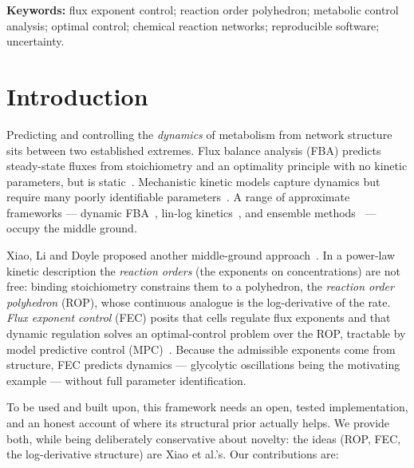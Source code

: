 \documentclass[11pt]{article}
\begin{document}
\noindent\textbf{Keywords:} flux exponent control; reaction order polyhedron;
metabolic control analysis; optimal control; chemical reaction networks;
reproducible software; uncertainty.

\tableofcontents

\section{Introduction}

Predicting and controlling the \emph{dynamics} of metabolism from network
structure sits between two established extremes. Flux balance analysis (FBA)
predicts steady-state fluxes from stoichiometry and an optimality principle with
no kinetic parameters, but is static~\citep{orth2010fba,varma1994stoichiometric}.
Mechanistic kinetic models capture dynamics but require many poorly identifiable
parameters~\citep{saa2017kinetic}. A range of approximate frameworks --- dynamic
FBA~\citep{mahadevan2002dfba}, lin-log kinetics~\citep{hatzimanikatis1997loglinear,
visser2003linlog}, and ensemble methods~\citep{miskovic2010oracle,smallbone2007bridging}
--- occupy the middle ground.

Xiao, Li and Doyle proposed another middle-ground
approach~\citep{xiao2023fec,xiao2022thesis}. In a power-law kinetic description
the \emph{reaction orders} (the exponents on concentrations) are not free:
binding stoichiometry constrains them to a polyhedron, the \emph{reaction order
polyhedron} (ROP), whose continuous analogue is the log-derivative of the rate.
\emph{Flux exponent control} (FEC) posits that cells regulate flux exponents and
that dynamic regulation solves an optimal-control problem over the ROP, tractable
by model predictive control (MPC)~\citep{rawlings2017mpc}. Because the admissible
exponents come from structure, FEC predicts dynamics --- glycolytic oscillations
being the motivating example --- without full parameter identification.

To be used and built upon, this framework needs an open, tested implementation,
and an honest account of where its structural prior actually helps. We provide
both, while being deliberately conservative about novelty: the ideas (ROP, FEC,
the log-derivative structure) are Xiao et al.'s. Our contributions are:
\end{document}
